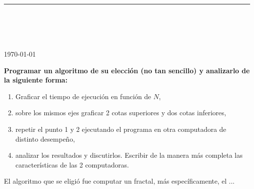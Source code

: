 

\newcommand{\diannao}{\texttt{diannao}}
\newcommand{\hongdiannao}{\texttt{hongdiannao}}



\thispagestyle{empty}

\begin{center}
\textsc{\theinstitution}\\[2mm]

\thedepartment

\rule{0.6\textwidth}{0.5pt}\\[2mm]

\thecourse \\[4mm]

{\Large \textbf{\thetitle}}\\[2mm]

\theauthor \\[2mm]

{\small \today}
\end{center}
\medskip

\vspace{1cm}

\textbf{%
Programar un algoritmo de su elección (no tan sencillo) y analizarlo de la siguiente forma:}
\begin{enumerate}
    \item Graficar el tiempo de ejecución en función de $N$,
    \item sobre los mismos ejes graficar 2 cotas superiores y dos cotas inferiores,
    \item repetir el punto 1 y 2 ejecutando el programa en otra computadora de distinto desempeño,
    \item analizar los resultados y discutirlos. Escribir de la manera más completa las características de las 2 computadoras.
\end{enumerate}

\vspace{1cm}

El algoritmo que se eligió fue computar un fractal, más específicamente, el ...

